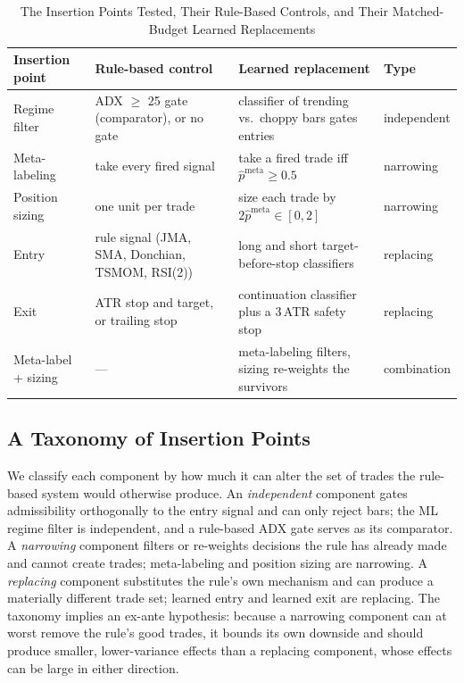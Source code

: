\begin{table}[!t]
\centering
\caption{The Insertion Points Tested, Their Rule-Based Controls, and Their Matched-Budget Learned Replacements}
\label{tab:insertion}
\footnotesize
\begin{tabular}{l p{4.3cm} p{6.3cm} l}
\toprule
Insertion point & Rule-based control & Learned replacement & Type \\
\midrule
Regime filter & ADX $\geq$ 25 gate (comparator), or no gate & classifier of trending vs.\ choppy bars gates entries & independent \\
Meta-labeling & take every fired signal & take a fired trade iff $\hat p^{\text{meta}} \geq 0.5$ & narrowing \\
Position sizing & one unit per trade & size each trade by $2\hat p^{\text{meta}} \in [0, 2]$ & narrowing \\
Entry & rule signal (JMA, SMA, Donchian, TSMOM, RSI(2)) & long and short target-before-stop classifiers & replacing \\
Exit & ATR stop and target, or trailing stop & continuation classifier plus a 3\,ATR safety stop & replacing \\
Meta-label + sizing & --- & meta-labeling filters, sizing re-weights the survivors & combination \\
\bottomrule
\end{tabular}
\end{table}



\subsection{A Taxonomy of Insertion Points}
\label{sec:taxonomy}

We classify each component by how much it can alter the set of trades the rule-based system would otherwise produce.
An \emph{independent} component gates admissibility orthogonally to the entry signal and can only reject bars; the ML
regime filter is independent, and a rule-based ADX gate serves as its comparator. A \emph{narrowing} component filters
or re-weights decisions the rule has already made and cannot create trades; meta-labeling and position sizing are
narrowing. A \emph{replacing} component substitutes the rule's own mechanism and can produce a materially different
trade set; learned entry and learned exit are replacing. The taxonomy implies an ex-ante hypothesis: because a
narrowing component can at worst remove the rule's good trades, it bounds its own downside and should produce smaller,
lower-variance effects than a replacing component, whose effects can be large in either direction.


